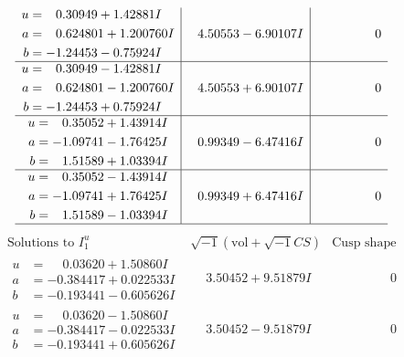 \documentclass[1p]{elsarticle_modified}
\theoremstyle{definition}
\newcommand{\I}{\sqrt{-1}}
\begin{document}
$$\begin{array}{c|c|c}
\begin{aligned}
u &= \phantom{-}0.30949 + 1.42881 I \\
a &= \phantom{-}0.624801 + 1.200760 I \\
b &= -1.24453 - 0.75924 I\end{aligned}
 & \phantom{-}4.50553 - 6.90107 I & \phantom{-0.000000 } 0 \\ \hline\begin{aligned}
u &= \phantom{-}0.30949 - 1.42881 I \\
a &= \phantom{-}0.624801 - 1.200760 I \\
b &= -1.24453 + 0.75924 I\end{aligned}
 & \phantom{-}4.50553 + 6.90107 I & \phantom{-0.000000 } 0 \\ \hline\begin{aligned}
u &= \phantom{-}0.35052 + 1.43914 I \\
a &= -1.09741 - 1.76425 I \\
b &= \phantom{-}1.51589 + 1.03394 I\end{aligned}
 & \phantom{-}0.99349 - 6.47416 I & \phantom{-0.000000 } 0 \\ \hline\begin{aligned}
u &= \phantom{-}0.35052 - 1.43914 I \\
a &= -1.09741 + 1.76425 I \\
b &= \phantom{-}1.51589 - 1.03394 I\end{aligned}
 & \phantom{-}0.99349 + 6.47416 I & \phantom{-0.000000 } 0\\
 \hline 
 \end{array}$$\newpage$$\begin{array}{c|c|c}  
\text{Solutions to }I^u_{1}& \I (\text{vol} + \sqrt{-1}CS) & \text{Cusp shape}\\
 \hline 
\begin{aligned}
u &= \phantom{-}0.03620 + 1.50860 I \\
a &= -0.384417 + 0.022533 I \\
b &= -0.193441 - 0.605626 I\end{aligned}
 & \phantom{-}3.50452 + 9.51879 I & \phantom{-0.000000 } 0 \\ \hline\begin{aligned}
u &= \phantom{-}0.03620 - 1.50860 I \\
a &= -0.384417 - 0.022533 I \\
b &= -0.193441 + 0.605626 I\end{aligned}
 & \phantom{-}3.50452 - 9.51879 I & \phantom{-0.000000 } 0 \\ \hline\begin{aligned}

\end{aligned}
\end{array}$$
\end{document}
